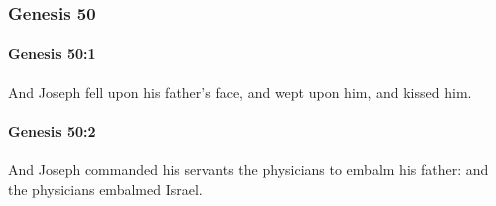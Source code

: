 	\subsubsection{Genesis 50} %
		\label{GENESIS-50}

		\paragraph{Genesis 50:1} %
			\label{GENESIS-50-1}

			And Joseph fell upon his father's face, and wept upon him, and kissed him.


		\paragraph{Genesis 50:2} %
			\label{GENESIS-50-2}

			And Joseph commanded his servants the physicians to embalm his father: and the physicians embalmed Israel.


